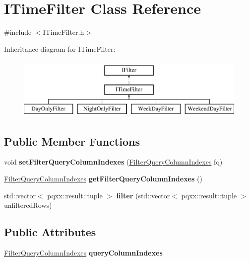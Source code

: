 \hypertarget{classITimeFilter}{}\section{I\+Time\+Filter Class Reference}
\label{classITimeFilter}


{\ttfamily \#include $<$I\+Time\+Filter.\+h$>$}

Inheritance diagram for I\+Time\+Filter\+:\begin{figure}[H]
\begin{center}
\leavevmode
\includegraphics[height=3.000000cm]{classITimeFilter}
\end{center}
\end{figure}
\subsection*{Public Member Functions}
\begin{DoxyCompactItemize}
\item 
\mbox{\label{classITimeFilter_ab4eaa567bbbc24f5ad60d098cb1e8f42}} 
void {\bfseries set\+Filter\+Query\+Column\+Indexes} (\hyperlink{structFilterQueryColumnIndexes}{Filter\+Query\+Column\+Indexes} fq)
\item 
\mbox{\label{classITimeFilter_a5f9b872405149c0ae2f02b0e25501ea3}} 
\hyperlink{structFilterQueryColumnIndexes}{Filter\+Query\+Column\+Indexes} {\bfseries get\+Filter\+Query\+Column\+Indexes} ()
\item 
\mbox{\label{classITimeFilter_aaeb17cef644e35b7bf9d60d26f9fafd6}} 
std\+::vector$<$ pqxx\+::result\+::tuple $>$ {\bfseries filter} (std\+::vector$<$ pqxx\+::result\+::tuple $>$ unfiltered\+Rows)
\end{DoxyCompactItemize}
\subsection*{Public Attributes}
\begin{DoxyCompactItemize}
\item 
\mbox{\label{classITimeFilter_a2b63e7e266780304d49e971ae7bc4591}} 
\hyperlink{structFilterQueryColumnIndexes}{Filter\+Query\+Column\+Indexes} {\bfseries query\+Column\+Indexes}
\end{DoxyCompactItemize}



